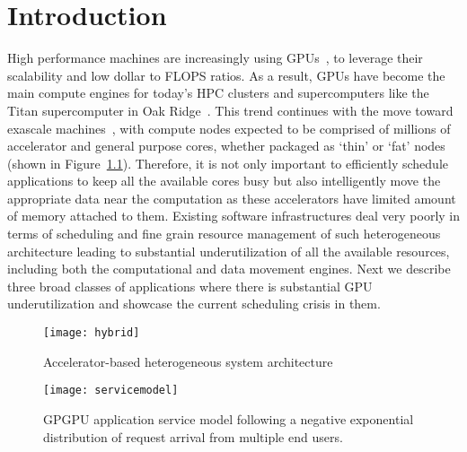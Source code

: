 \chapter{Introduction}
\label{intro}

High performance machines are increasingly using GPUs~\cite{15, 16, 17, 18, 19}, to leverage their scalability and low dollar to FLOPS ratios.  As a result, GPUs have become the main compute engines for today’s HPC clusters and supercomputers like the Titan supercomputer in Oak Ridge~\cite{titan}. This trend continues with the move toward exascale machines~\cite{exascale1, exascale2, exascale3, exascale4, exascale5, exascale6, exascale7}, with compute nodes expected to be comprised of millions of accelerator and general purpose cores, whether packaged as `thin' or `fat' nodes (shown in Figure~\ref{fig:hybrid}).  Therefore, it is not only important to efficiently schedule applications to keep all the available cores busy but also  intelligently move the appropriate data near the computation as these accelerators have limited amount of memory attached to them. Existing software infrastructures deal very poorly in terms of scheduling and fine grain resource management of such heterogeneous architecture leading to substantial underutilization of all the available resources, including both the computational and data movement engines. Next we describe three broad classes of applications where there is substantial GPU underutilization and showcase the current scheduling crisis in them. 

\begin{figure}[h]
\begin{center}
\texttt{[image: hybrid]}
\caption{Accelerator-based heterogeneous system architecture }
\label{fig:hybrid}
\end{center}	
\end{figure}

\begin{figure}[t]
\begin{center}
\texttt{[image: servicemodel]}
\caption{GPGPU application service model following a negative exponential
distribution of request arrival from multiple end users. }
\label{fig:service}
\end{center}	
\end{figure}

